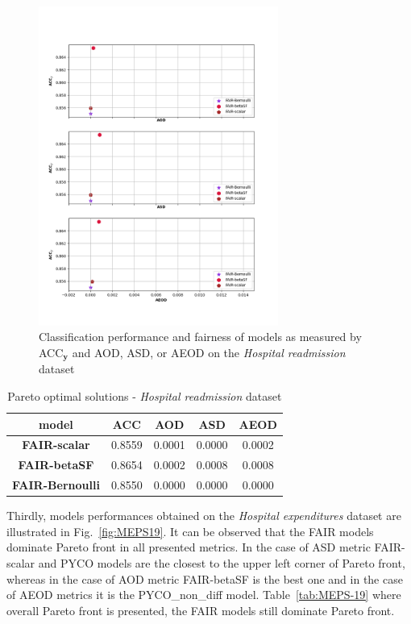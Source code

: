 \documentclass[preprint,12pt]{elsarticle}
\begin{document}
\begin{figure}
	\center
	\includegraphics[angle=0, width=0.7\textwidth]{Readmission_ACC.png}
	\captionsetup{justification=centering}
	\caption{Classification performance and fairness of models as measured by ACC$_\mathbf{y}$ and AOD, ASD, or AEOD on the \textit{Hospital readmission} dataset}
	\label{fig:Readmission}
	\vskip -0.2in
\end{figure}

\begin{table}
	\centering
	\caption{Pareto optimal solutions - \textit{Hospital readmission} dataset}
	\begin{tabular}{|c|c|c|c|c|}
		\hline
		\textbf{model}          & \textbf{ACC} & \textbf{AOD} & \textbf{ASD} & \textbf{AEOD} \\ \hline
		\textbf{FAIR-scalar}    & 0.8559     & 0.0001     & 0.0000     & 0.0002      \\ \hline
		\textbf{FAIR-betaSF}    & 0.8654     & 0.0002     & 0.0008     & 0.0008      \\ \hline
		\textbf{FAIR-Bernoulli} & 0.8550     & 0.0000            & 0.0000            & 0.0000             \\ \hline
	\end{tabular}
	\label{tab:Readmission}%
\end{table}

Thirdly, models performances obtained on the \textit{Hospital expenditures} dataset are illustrated in Fig.~\ref{fig:MEPS19}. It can be observed that the FAIR models dominate Pareto front in all presented metrics. In the case of ASD metric FAIR-scalar and PYCO models are the closest to the upper left corner of Pareto front, whereas in the case of AOD metric FAIR-betaSF is the best one and in the case of AEOD metrics it is the PYCO\_non\_diff model. Table~\ref{tab:MEPS-19} where overall Pareto front is presented, the FAIR models still dominate Pareto front.
\end{document}
